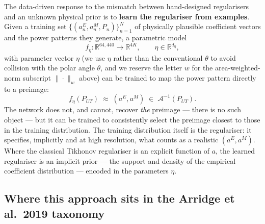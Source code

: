 \documentclass[11pt,a4paper]{report}
\begin{document}
The data-driven response to the mismatch between hand-designed regularisers and an
unknown physical prior is to \textbf{learn the regulariser from examples}. Given a
training set $\{(a^E_n, a^M_n, P_n)\}_{n=1}^N$ of physically plausible coefficient
vectors and the power patterns they generate, a parametric model
\[
f_\eta \colon \mathbb{R}^{64{,}440} \to \mathbb{R}^{4K},\qquad \eta\in\mathbb{R}^{d_\eta},
\]
with parameter vector $\eta$ (we use $\eta$ rather than the conventional $\theta$
to avoid collision with the polar angle $\theta$, and we reserve the letter $w$ for
the area-weighted-norm subscript $\|\cdot\|_w$ above) can be trained to map the
power pattern directly to a preimage:
\[
f_\eta(P_{UT}) \;\approx\; (a^E, a^M)\;\in\;\mathcal{A}^{-1}(P_{UT}).
\]
The network does not, and cannot, recover \emph{the} preimage --- there is no such
object --- but it can be trained to consistently select the preimage closest to
those in the training distribution. The training distribution itself is the
regulariser: it specifies, implicitly and at high resolution, what counts as a
realistic $(a^E, a^M)$. Where the classical Tikhonov regulariser is an explicit
function of $a$, the learned regulariser is an implicit prior --- the support and
density of the empirical coefficient distribution --- encoded in the parameters
$\eta$.

\subsection*{Where this approach sits in the Arridge et al.\ 2019 taxonomy}
\end{document}
